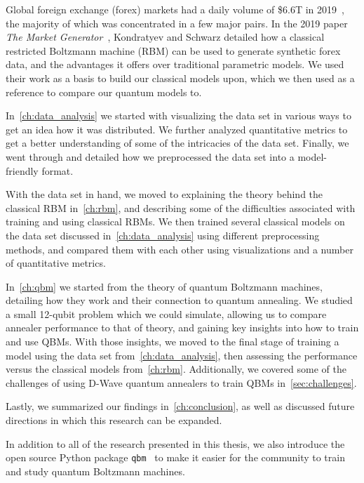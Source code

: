 Global foreign exchange (forex) markets had a daily volume of \$6.6T in 2019~\cite{bis_2019}, the majority of which was concentrated in a few major pairs.
In the 2019 paper \textit{The Market Generator}~\cite{kondratyev_2019}, Kondratyev and Schwarz detailed how a classical restricted Boltzmann machine (RBM) can be used to generate synthetic forex data, and the advantages it offers over traditional parametric models.
We used their work as a basis to build our classical models upon, which we then used as a reference to compare our quantum models to.

In~\cref{ch:data_analysis} we started with visualizing the data set in various ways to get an idea how it was distributed.
We further analyzed quantitative metrics to get a better understanding of some of the intricacies of the data set.
Finally, we went through and detailed how we preprocessed the data set into a model-friendly format.

With the data set in hand, we moved to explaining the theory behind the classical RBM in~\cref{ch:rbm}, and describing some of the difficulties associated with training and using classical RBMs.
We then trained several classical models on the data set discussed in~\cref{ch:data_analysis} using different preprocessing methods, and compared them with each other using visualizations and a number of quantitative metrics.

In~\cref{ch:qbm} we started from the theory of quantum Boltzmann machines, detailing how they work and their connection to quantum annealing.
We studied a small 12-qubit problem which we could simulate, allowing us to compare annealer performance to that of theory, and gaining key insights into how to train and use QBMs.
With those insights, we moved to the final stage of training a model using the data set from~\cref{ch:data_analysis}, then assessing the performance versus the classical models from~\cref{ch:rbm}.
Additionally, we covered some of the challenges of using D-Wave quantum annealers to train QBMs in~\cref{sec:challenges}.

Lastly, we summarized our findings in~\cref{ch:conclusion}, as well as discussed future directions in which this research can be expanded.

In addition to all of the research presented in this thesis, we also introduce the open source Python package \texttt{qbm}~\cite{qbm} to make it easier for the community to train and study quantum Boltzmann machines.
